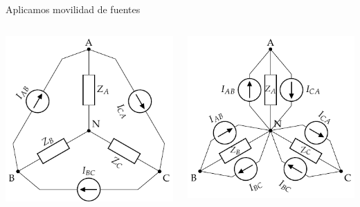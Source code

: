 \documentclass[aspectratio=169, usenames,svgnames,dvipsnames]{beamer}
\begin{document}
\begin{frame}[label={sec:org78290b7}]{Aplicamos movilidad de fuentes}
\begin{columns}
\begin{column}{0.5\columnwidth}
\begin{center}
\includegraphics[width=\textwidth]{../figs/GeneradorRealTriangulo_I_ZEstrella.pdf}
\end{center}
\end{column}

\begin{column}{0.5\columnwidth}
\begin{center}
\includegraphics[width=\textwidth]{../figs/GeneradorRealTriangulo_Transformado1.pdf}
\end{center}
\end{column}
\end{columns}
\end{frame}
\end{document}
